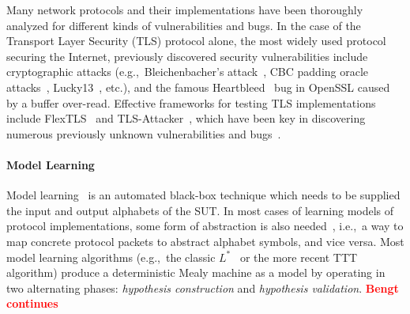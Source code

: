 \documentclass[11pt]{article}
\newcommand{\FIX}[1]{\textcolor{red}{\textbf{#1}}}
\newcommand{\system}[1]{\mbox{\textsf{#1}}}
\newcommand{\myparagraph}{}
\let\myparagraph=\paragraph
\renewcommand{\paragraph}{\vspace{-3mm}\myparagraph}
\newcommand{\eg}{e.\/g.,\ }
\newcommand{\ie}{i.\/e.,\ }
\begin{document}
Many network protocols and their implementations have been thoroughly analyzed
for different kinds of vulnerabilities and bugs. In the case of the Transport
Layer Security (TLS) protocol alone, the most widely used protocol securing
the Internet, previously discovered security vulnerabilities include
cryptographic attacks (\eg Bleichenbacher's attack~\cite{Bleichenbacher1998},
CBC padding oracle attacks~\cite{Vaudenay:CBCWeaknesses:02},
Lucky13~\cite{Lucky13@SP-13}, etc.), and the famous
Heartbleed~\cite{heartbleed} bug in OpenSSL caused by a buffer over-read.
%
Effective frameworks for testing TLS implementations include
\system{FlexTLS}~\cite{FlexTLS@WOOT-15} and
\system{TLS-Attacker}~\cite{somorovsky2016}, which have been key in discovering
numerous previously unknown vulnerabilities and bugs~\cite{MessyTLS@CACM-17}.

\paragraph{Model Learning}
Model learning~\cite{Vaandrager@CACM-17} is an automated black-box technique
which needs to be supplied the input and output alphabets of the SUT.  In most
cases of learning models of protocol implementations, some form of abstraction
is also needed~\cite{AJUV15}, \ie a way to map concrete protocol packets to
abstract alphabet symbols, and vice versa.
%
Most model learning algorithms (\eg the classic $L^*$~\cite{Angluin1987} or
the more recent TTT~\cite{IHS2014} algorithm)
produce a deterministic Mealy machine as a model by operating in two alternating
phases: \emph{hypothesis construction} and \emph{hypothesis validation}.
%
\FIX{Bengt continues}
\end{document}
